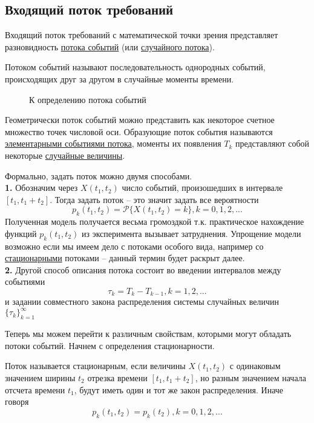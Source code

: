 
\subsection{Входящий поток требований}

Входящий поток требований с математической точки зрения представляет разновидность \underline{потока событий} (или \underline{случайного потока}).

\begin{definition}
	{\color{red}Потоком событий} называют последовательность однородных событий, происходящих друг за другом в случайные моменты времени.
\end{definition}

\begin{figure}[h!]
	\centering
	\caption{К определению потока событий}
\end{figure}

Геометрически поток событий можно представить как некоторое счетное множество точек числовой оси. Образующие поток события называются \\ \underline{элементарными событиями потока}, моменты их появления $T_k$ представляют собой некоторые \underline{случайные величины}.

Формально, задать поток можно двумя способами. \\
\textbf{1.} Обозначим через $X(t_1, t_2)$ число событий, произошедших в интервале \\ $[t_1, t_1 + t_2]$. Тогда задать поток -- это значит задать все вероятности
$$p_k (t_1, t_2) = \mathcal{P}\{X(t_1, t_2) = k\}, k = 0, 1, 2, ...$$
Полученная модель получается весьма громоздкой т.к. практическое нахождение функций $p_k (t_1, t_2)$ из эксперимента вызывает затруднения. Упрощение модели возможно если мы имеем дело с потоками особого вида, например со \underline{стационарными} потоками -- данный термин будет раскрыт далее. \\
\textbf{2.} Другой способ описания потока состоит во введении интервалов между событиями
$$\tau_k = T_k - T_{k-1}, k = 1, 2, ...$$
и задании совместного закона распределения системы случайных величин $\{\tau_k\}_{k=1}^{\infty}$

Теперь мы можем перейти к различным свойствам, которыми могут обладать потоки событий. Начнем с определения стационарности.

\begin{definition}
	Поток называется {\color{red}стационарным}, если величины $X(t_1, t_2)$ с одинаковым значением ширины $t_2$ отрезка времени $[t_1, t_1 + t_2]$, но разным значением начала отсчета времени $t_1$, будут иметь один и тот же закон распределения. Иначе говоря
	$$p_k (t_1, t_2) = p_k (t_2), k = 0, 1, 2, ...$$
\end{definition}

